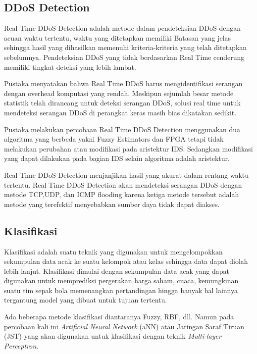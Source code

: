 \subsection{DDoS Detection}

Real Time DDoS Detection adalah metode dalam pendeteksian DDoS dengan acuan waktu tertentu, waktu yang ditetapkan memiliki Batasan yang jelas \cite{ddosfuzzy} sehingga hasil yang dihasilkan memenuhi kriteria-kriteria yang telah ditetapkan sebelumnya.
Pendeteksian DDoS yang tidak berdasarkan Real Time cenderung memiliki tingkat deteksi yang lebih lambat\cite{ddosfuzzy}.

Pustaka \cite{ddosfpga} menyatakan bahwa Real Time DDoS harus mengidentifikasi serangan dengan overhead komputasi yang rendah. Meskipun sejumlah besar metode statistik telah dirancang untuk deteksi serangan DDoS, solusi real time untuk mendeteksi serangan DDoS di perangkat keras masih bias dikatakan sedikit.

Pustaka \cite{ddosfuzzy}\cite{ddosfpga} melakukan percobaan Real Time DDoS Detection menggunakan dua algoritma yang berbeda yakni Fuzzy Estimators dan FPGA tetapi tidak melakukan perubahan atau modifikasi pada aristektur IDS. Sedangkan modifikasi yang dapat dilakukan pada bagian IDS selain algoritma adalah aristektur.

Real Time DDoS Detection menjanjikan hasil yang akurat dalam rentang waktu tertentu\cite{ddosfuzzy}. Real Time DDoS Detection akan mendeteksi serangan DDoS dengan metode TCP,UDP, dan ICMP flooding karena ketiga metode tersebut adalah metode yang terefektif menyebabkan sumber daya tidak dapat diakses\cite{ddosstat}.

\subsection{Klasifikasi}
Klasifikasi adalah suatu teknik yang digunakan untuk mengelompokkan sekumpulan data acak ke suatu kelompok atau kelas sehingga data dapat diolah lebih lanjut\cite{klasifikasi}. Klasifikasi dimulai dengan sekumpulan data acak yang dapat digunakan untuk memprediksi pergerakan harga saham, cuaca, kemungkinan suatu tim sepak bola memenangkan pertandingan hingga banyak hal lainnya tergantung model yang dibuat untuk tujuan tertentu.

Ada beberapa metode klasifikasi diantaranya Fuzzy, RBF, dll. Namun pada percobaan kali ini \textit{Artificial Neural Network} (aNN) atau Jaringan Saraf Tiruan (JST) yang akan digunakan untuk klasifikasi dengan teknik \textit{Multi-layer Perceptron}.


